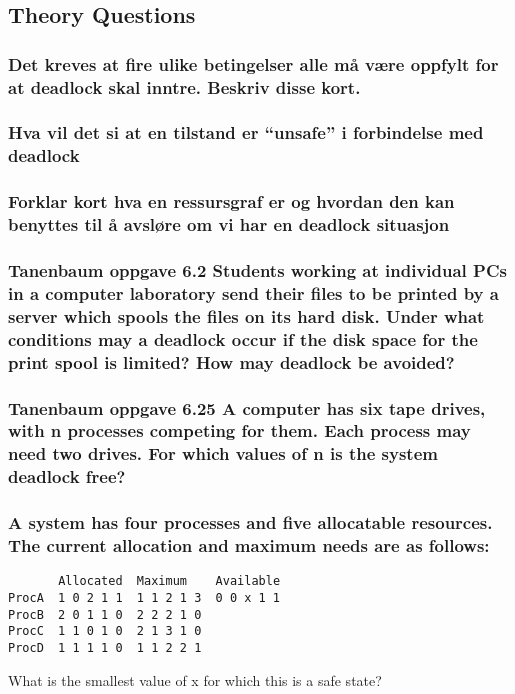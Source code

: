 \documentclass[9pt]{article}
\begin{document}
\subsection{Theory Questions}
\subsubsection{Det kreves at fire ulike betingelser alle må være oppfylt for at deadlock skal inntre. Beskriv disse kort.}



\subsubsection{Hva vil det si at en tilstand er “unsafe” i forbindelse med deadlock}

\subsubsection{Forklar kort hva en ressursgraf er og hvordan den kan benyttes til å avsløre om vi har en deadlock situasjon}

\subsubsection{Tanenbaum oppgave 6.2 Students working at individual PCs in a computer laboratory send their files to be printed by a server which spools the files on its hard disk. Under what conditions may a deadlock occur if the disk space for the print spool is limited? How may deadlock be avoided?}

\subsubsection{Tanenbaum oppgave 6.25 A computer has six tape drives, with n processes competing for them. Each process may need two drives. For which values of n is the system deadlock free?}

\subsubsection{A system has four processes and five allocatable resources. The current allocation and maximum needs are as follows: }
\begin{verbatim}
       Allocated  Maximum    Available
ProcA  1 0 2 1 1  1 1 2 1 3  0 0 x 1 1
ProcB  2 0 1 1 0  2 2 2 1 0
ProcC  1 1 0 1 0  2 1 3 1 0
ProcD  1 1 1 1 0  1 1 2 2 1
\end{verbatim}
What is the smallest value of x for which this is a safe state?


\
\end{document}
